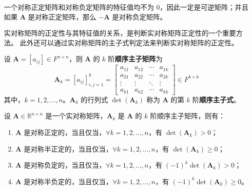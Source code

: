 \begin{corollary}
    一个对称正定矩阵和对称负定矩阵的特征值均不为 0，因此一定是可逆矩阵；并且如果 $\mathbf{A}$ 是对称正定矩阵，那么 $-\mathbf{A}$ 是对称负定矩阵。
\end{corollary}

\begin{note}
    实对称矩阵的正定性与其特征值的关系，是判断实对称矩阵正定性的一个重要方法。
    此外还可以通过实对称矩阵的主子式判定法来判断实对称矩阵的正定性。
\end{note}

\begin{definition}
    设 $\mathbf{A} = [a_{ij}] \in F^{n \times n}$，则 $\mathbf{A}$ 的 $k$ 阶\textbf{顺序主子矩阵}为
    \[
        \mathbf{A}_k = [a_{ij}]_{i,j=1}^k = \begin{bmatrix}
            a_{11} & a_{12} & \cdots & a_{1k} \\
            a_{21} & a_{22} & \cdots & a_{2k} \\
            \vdots & \vdots & \ddots & \vdots \\
            a_{k1} & a_{k2} & \cdots & a_{kk}
        \end{bmatrix}
        \in F^{k \times k}
    \]
    其中，$k = 1,2,\ldots,n$。$\mathbf{A}_k$ 的行列式 $\det(\mathbf{A}_k)$ 称为 $\mathbf{A}$ 的第 $k$ 阶\textbf{顺序主子式}。
    \label{def:leading_principal_submatrix}
\end{definition}

\begin{proposition}[实对称矩阵的正定性顺序主子式判定法]
    设 $\mathbf{A}\in \mathbb{R}^{n\times n}$ 是一个实对称矩阵，$\mathbf{A}_k$ 是 $\mathbf{A}$ 的 $k$ 阶顺序主子矩阵，则有：
    \begin{enumerate}
        \item $\mathbf{A}$ 是对称正定的，当且仅当，$\forall k=1,2,\ldots,n$，有 $\det(\mathbf{A}_k) > 0$；
        \item $\mathbf{A}$ 是对称半正定的，当且仅当，$\forall k=1,2,\ldots,n$，有 $\det(\mathbf{A}_k) \geq 0$；
        \item $\mathbf{A}$ 是对称负定的，当且仅当，$\forall k=1,2,\ldots,n$，有 $(-1)^k \det(\mathbf{A}_k) > 0$；
        \item $\mathbf{A}$ 是对称半负定的，当且仅当，$\forall k=1,2,\ldots,n$，有 $(-1)^k \det(\mathbf{A}_k) \geq 0$。
    \end{enumerate}
    \label{prop:real_symmetric_matrix_positive_definite_leading_principal_minor}
\end{proposition}


